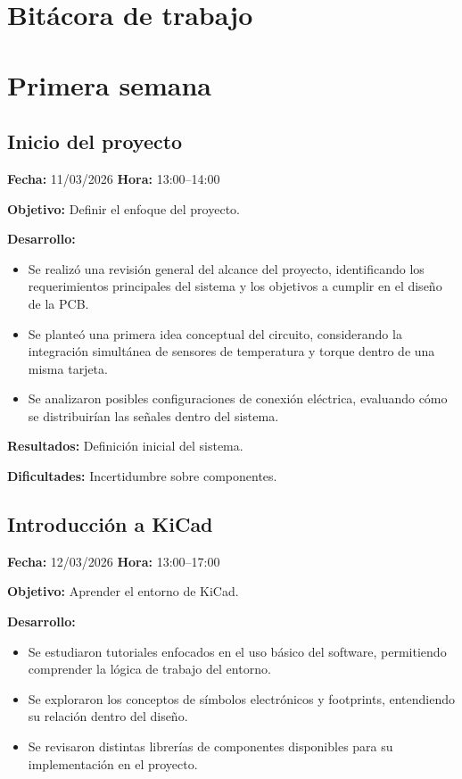 \documentclass[12pt]{article}
\begin{document}
\section{Bitácora de trabajo}

\section{Primera semana}

\subsection{Inicio del proyecto}
\textbf{Fecha:} 11/03/2026 \quad \textbf{Hora:} 13:00--14:00

\textbf{Objetivo:}
Definir el enfoque del proyecto.

\textbf{Desarrollo:}
\begin{itemize}
\item Se realizó una revisión general del alcance del proyecto, identificando los requerimientos principales del sistema y los objetivos a cumplir en el diseño de la PCB.
\item Se planteó una primera idea conceptual del circuito, considerando la integración simultánea de sensores de temperatura y torque dentro de una misma tarjeta.
\item Se analizaron posibles configuraciones de conexión eléctrica, evaluando cómo se distribuirían las señales dentro del sistema.
\end{itemize}

\textbf{Resultados:}
Definición inicial del sistema.

\textbf{Dificultades:}
Incertidumbre sobre componentes.

\subsection{Introducción a KiCad}
\textbf{Fecha:} 12/03/2026 \quad \textbf{Hora:} 13:00--17:00

\textbf{Objetivo:}
Aprender el entorno de KiCad.

\textbf{Desarrollo:}
\begin{itemize}
\item Se estudiaron tutoriales enfocados en el uso básico del software, permitiendo comprender la lógica de trabajo del entorno.
\item Se exploraron los conceptos de símbolos electrónicos y footprints, entendiendo su relación dentro del diseño.
\item Se revisaron distintas librerías de componentes disponibles para su implementación en el proyecto.
\end{itemize}
\end{document}
